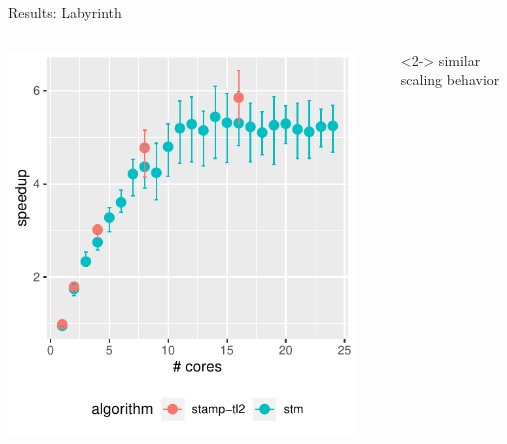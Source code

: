 \documentclass[aspectratio=169, usenames, dvipsnames]{beamer}
\newcommand{\cmark}{\ding{51}}%
\newcommand{\done}{\rlap{$\square$}{\raisebox{2pt}{\large\hspace{1pt}\cmark}}%
\hspace{-2.5pt}}
\begin{document}
\begin{frame}{Results: Labyrinth}
    \begin{columns}%
        \begin{column}{0.5\textwidth}
            \centering
            \includegraphics[width=\textwidth,height=.65\textheight,keepaspectratio]{img/combined_plots/labyrinth++}
        \end{column}%
        \begin{column}{0.5\textwidth}
            \begin{itemize}
                \item[\done]<2-> similar scaling behavior\\ \ 
            \end{itemize}
        \end{column}
    \end{columns}
\end{frame}
\end{document}
